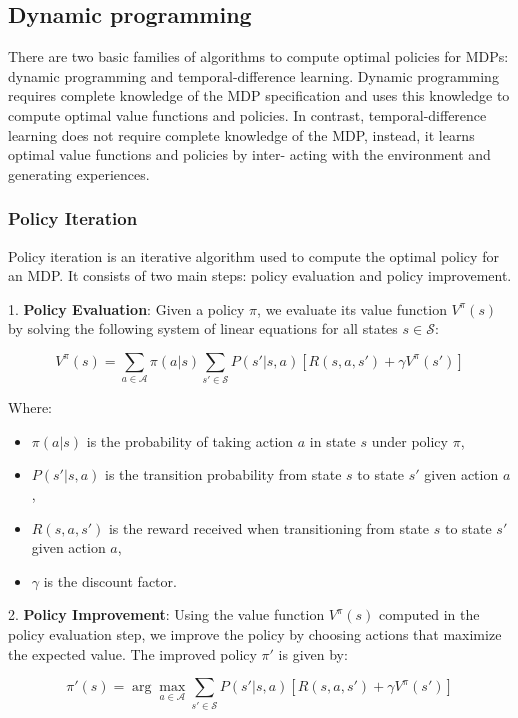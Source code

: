 \subsection{Dynamic programming}
There are two basic families of algorithms to compute optimal policies for MDPs: dynamic programming and temporal-difference learning.
Dynamic programming requires complete knowledge of the MDP specification
and uses this knowledge to compute optimal value functions and policies. In
contrast, temporal-difference learning does not require complete knowledge
of the MDP, instead, it learns optimal value functions and policies by inter-
acting with the environment and generating experiences.

\subsubsection{Policy Iteration}

Policy iteration is an iterative algorithm used to compute the optimal policy for an MDP. It consists of two main steps: policy evaluation and policy improvement.

1. \textbf{Policy Evaluation}: Given a policy \(\pi\), we evaluate its value function \(V^\pi(s)\) by solving the following system of linear equations for all states \(s \in \mathcal{S}\):

\[
V^\pi(s) = \sum_{a \in \mathcal{A}} \pi(a|s) \sum_{s' \in \mathcal{S}} P(s'|s, a) \left[ R(s, a, s') + \gamma V^\pi(s') \right]
\]

Where:
\begin{itemize}
    \item \(\pi(a|s)\) is the probability of taking action \(a\) in state \(s\) under policy \(\pi\),
    \item \(P(s'|s, a)\) is the transition probability from state \(s\) to state \(s'\) given action \(a\),
    \item \(R(s, a, s')\) is the reward received when transitioning from state \(s\) to state \(s'\) given action \(a\),
    \item \(\gamma\) is the discount factor.
\end{itemize}

2. \textbf{Policy Improvement}: Using the value function \(V^\pi(s)\) computed in the policy evaluation step, we improve the policy by choosing actions that maximize the expected value. The improved policy \(\pi'\) is given by:

\[
\pi'(s) = \arg\max_{a \in \mathcal{A}} \sum_{s' \in \mathcal{S}} P(s'|s, a) \left[ R(s, a, s') + \gamma V^\pi(s') \right]
\]

